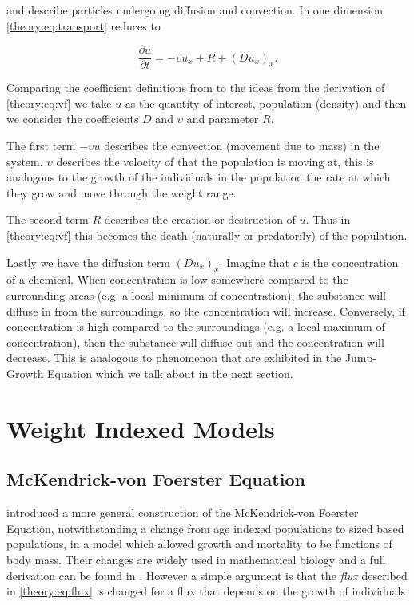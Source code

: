 \documentclass[../main.tex]{subfiles}
\begin{document}
  and describe particles undergoing diffusion and convection. In one dimension \autoref{theory:eq:transport} reduces to

  \begin{equation}\label{theory:eq:transport1d}
    \frac{\partial u}{\partial t} = - \upsilon u_x + R + (D u_x)_x.
  \end{equation}

  Comparing the coefficient definitions from \cite{stocker2011} to the ideas from the derivation of \autoref{theory:eq:vf} we take $u$ as the quantity of interest, population (density) and then we consider the coefficients $D$ and $\upsilon$ and parameter $R$.

  The first term $-\upsilon u$ describes the convection (movement due to mass) in the system. $\upsilon$ describes the velocity of that the population is moving at, this is analogous to the growth of the individuals in the population the rate at which they grow and move through the weight range.

  The second term $R$ describes the creation or destruction of $u$. Thus in \autoref{theory:eq:vf} this becomes the death (naturally or predatorily) of the population.

  Lastly we have the diffusion term $(D u_x)_x$. Imagine that $c$ is the concentration of a chemical. When concentration is low somewhere compared to the surrounding areas (e.g. a local minimum of concentration), the substance will diffuse in from the surroundings, so the concentration will increase. Conversely, if concentration is high compared to the surroundings (e.g. a local maximum of concentration), then the substance will diffuse out and the concentration will decrease. This is analogous to phenomenon that are exhibited in the Jump-Growth Equation which we talk about in the next section.

  \section{Weight Indexed Models}
  \subsection{McKendrick-von Foerster Equation}\label{theory:sec:mvf}
  \cite{silvert1978} introduced a more general construction of the McKendrick-von Foerster Equation, notwithstanding a change from age indexed populations to sized based populations, in a model which allowed growth and mortality to be functions of body mass. Their changes are widely used in mathematical biology and a full derivation can be found in \cite{silvert1978}. However a simple argument is that the \emph{flux} described in \autoref{theory:eq:flux} is changed for a flux that depends on the growth of individuals
\end{document}
